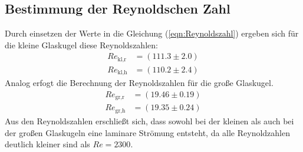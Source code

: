 \subsection{Bestimmung der Reynoldschen Zahl}
Durch einsetzen der Werte in die Gleichung (\ref{eqn:Reynoldszahl}) ergeben sich für die 
kleine Glaskugel diese Reynoldszahlen:
\begin{align*}
  Re_{\text{kl,r}} &= \left(111.3\pm2.0\right)\\
  Re_{\text{kl,h}} &= \left(110.2\pm2.4\right)
\end{align*}
Analog erfogt die Berechnung der Reynoldszahlen für die große Glaskugel.
\begin{align*}
  Re_{\text{gr,r}} &= \left(19.46\pm0.19\right)\\
  Re_{\text{gr,h}} &= \left(19.35\pm0.24\right)
\end{align*}
Aus den Reynoldszahlen erschließt sich, dass sowohl bei der kleinen als auch bei der großen Glaskugeln
eine laminare Strömung entsteht, da alle Reynoldzahlen deutlich kleiner sind als $Re=2300$.
%
